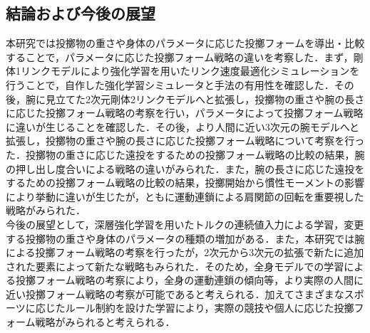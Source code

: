 \begin{small}
\section{結論および今後の展望}
本研究では投擲物の重さや身体のパラメータに応じた投擲フォームを導出・比較することで，パラメータに応じた投擲フォーム戦略の違いを考察した．まず，剛体1リンクモデルにより強化学習を用いたリンク速度最適化シミュレーションを行うことで，自作した強化学習シミュレータと手法の有用性を確認した．その後，腕に見立てた2次元剛体2リンクモデルへと拡張し，投擲物の重さや腕の長さに応じた投擲フォーム戦略の考察を行い，パラメータによって投擲フォーム戦略に違いが生じることを確認した．その後，より人間に近い3次元の腕モデルへと拡張し，投擲物の重さや腕の長さに応じた投擲フォーム戦略について考察を行った．投擲物の重さに応じた遠投をするための投擲フォーム戦略の比較の結果，腕の押し出し度合いによる戦略の違いがみられた．また，腕の長さに応じた遠投をするための投擲フォーム戦略の比較の結果，投擲開始から慣性モーメントの影響により挙動に違いが生じたが，ともに運動連鎖による肩関節の回転を重要視した戦略がみられた．\\
今後の展望として，深層強化学習を用いたトルクの連続値入力による学習，変更する投擲物の重さや身体のパラメータの種類の増加がある．また，本研究では腕による投擲フォーム戦略の考察を行ったが，2次元から3次元の拡張で新たに追加された要素によって新たな戦略もみられた．そのため，全身モデルでの学習による投擲フォーム戦略の考察により，全身の運動連鎖の傾向等，より実際の人間に近い投擲フォーム戦略の考察が可能であると考えられる．加えてさまざまなスポーツに応じたルール制約を設けた学習により，実際の競技や個人に応じた投擲フォーム戦略がみられると考えられる．






{
\scriptsize %


}

\end{small}

